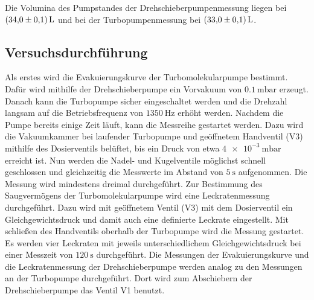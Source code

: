 \noindent
Die Volumina des Pumpstandes der Drehschieberpumpenmessung liegen bei $\SI{34 \pm 0.1}{\litre}$ und bei der Turbopumpenmessung bei $\SI{33 \pm 0.1}{\litre}$.

\subsection{Versuchsdurchführung}
\label{subsec:Versuchsdurchführung}

Als erstes wird die Evakuierungskurve der Turbomolekularpumpe bestimmt. Dafür wird mithilfe der Drehschieberpumpe ein Vorvakuum von $\SI{0,1}{\milli\bar}$ erzeugt. Danach kann die Turbopumpe sicher eingeschaltet werden und die Drehzahl
langsam auf die Betriebsfrequenz von $\SI{1350}{\hertz}$ erhöht werden. Nachdem die Pumpe bereits einige Zeit läuft, kann die Messreihe gestartet werden. Dazu wird die Vakuumkammer bei laufender Turbopumpe und geöffnetem Handventil (V3) mithilfe des Dosierventils belüftet,
bis ein Druck von etwa $\SI{4 e-3}{\milli\bar}$ erreicht ist. Nun werden die Nadel- und Kugelventile möglichst schnell geschlossen und gleichzeitig die Messwerte im Abstand von $\SI{5}{\second}$ aufgenommen. Die Messung wird mindestens dreimal durchgeführt. \newline
Zur Bestimmung des Saugvermögens der Turbomolekularpumpe wird eine Leckratenmessung durchgeführt. Dazu wird mit geöffnetem Ventil (V3) mit dem Dosierventil ein Gleichgewichtsdruck und damit auch eine definierte Leckrate eingestellt. Mit 
schließen des Handventils oberhalb der Turbopumpe wird die Messung gestartet. Es werden vier Leckraten mit jeweils unterschiedlichem Gleichgewichtsdruck bei einer Messzeit von $\SI{120}{\second}$ durchgeführt. \newline
Die Messungen der Evakuierungskurve und die Leckratenmessung der Drehschieberpumpe werden analog zu den Messungen an der Turbopumpe durchgeführt. Dort wird zum Abschiebern der Drehschieberpumpe das Ventil V1 benutzt.